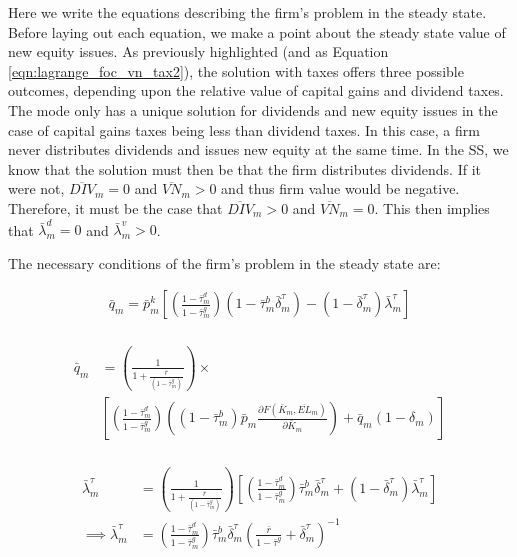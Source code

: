 \documentclass[letterpaper,12pt]{article}
\theoremstyle{definition}
\begin{document}
\begin{spacing}{1.5}
Here we write the equations describing the firm's problem in the steady state.  Before laying out each equation, we make a point about the steady state value of new equity issues.  As previously highlighted (and as Equation \ref{eqn:lagrange_foc_vn_tax2}), the solution with taxes offers three possible outcomes, depending upon the relative value of capital gains and dividend taxes.  The mode only has a unique solution for dividends and new equity issues in the case of capital gains taxes being less than dividend taxes.  In this case, a firm never distributes dividends and issues new equity at the same time.  In the SS, we know that the solution must then be that the firm distributes dividends.  If it were not, $\overline{DIV}_{m}=0$ and $\overline{VN}_{m}>0$ and thus firm value would be negative.  Therefore, it must be the case that $\overline{DIV}_{m}>0$ and $\overline{VN}_{m}=0$.  This then implies that $\bar{\lambda}^{d}_{m}=0$ and $\bar{\lambda}^{v}_{m}>0$.



The necessary conditions of the firm's problem in the steady state are:

\begin{equation}
\label{eqn:lagrange_foc_i_tax_ss}
\begin{split}
  \bar{q}_{m} = \bar{p}^{k}_{m}\left[\left(\frac{1-\bar{\tau}^{d}_{m}}{1-\bar{\tau}^{g}_{m}}\right)(1-\bar{\tau}^{b}_{m}\bar{\delta}^{\tau}_{m}) - (1-\bar{\delta}^{\tau}_{m})\bar{\lambda}^{\tau}_{m} \right]  \\
\end{split}
\end{equation}


\begin{equation}
\label{eqn:lagrange_foc_k_tax_ss}
\begin{split}
 \bar{q}_{m} &=  \left(\frac{1}{1+\frac{\bar{r}}{(1-\bar{\tau}^{g}_{m})}}\right) \times  \\
& \left[\left(\frac{1-\bar{\tau}^{d}_{m}}{1-\bar{\tau}^{g}_{m}}\right)\left((1-\bar{\tau}^{b}_{m})\bar{p}_{m}\frac{\partial F(\bar{K}_{m},\overline{EL}_{m})}{\partial \bar{K}_{m}}\right) + \bar{q}_{m}(1-\delta_{m}) \right]  \\
\end{split}
\end{equation}

\begin{equation}
\label{eqn:lagrange_foc_ktau_tax_ss}
\begin{split}
\bar{\lambda}^{\tau}_{m} &=  \left(\frac{1}{1+\frac{\bar{r}}{(1-\bar{\tau}^{g}_{m})}}\right) \left[ \left(\frac{1-\bar{\tau}^{d}_{m}}{1-\bar{\tau}^{g}_{m}}\right)\bar{\tau}^{b}_{m}\bar{\delta}^{\tau}_{m} + (1-\bar{\delta}^{\tau}_{m})\bar{\lambda}^{\tau}_{m}\right]  \\
\implies \bar{\lambda}^{\tau}_{m} &=\left(\frac{1-\bar{\tau}^{d}_{m}}{1-\bar{\tau}^{g}_{m}}\right)\bar{\tau}^{b}_{m}\bar{\delta}^{\tau}_{m}\left(\frac{\bar{r}}{1-\bar{\tau}^{g}}+\bar{\delta}^{\tau}_{m}\right)^{-1}
\end{split}
\end{equation}


\end{spacing}
\end{document}
